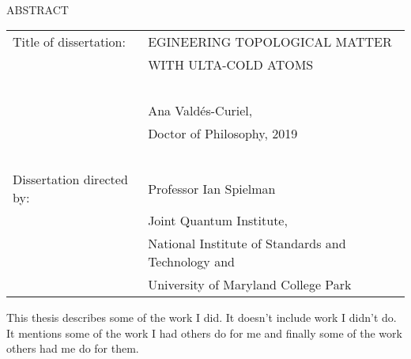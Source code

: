 
\hbox{\ }

\renewcommand{\baselinestretch}{1}
\small \normalsize

\begin{center}
\large{{ABSTRACT}} 

\vspace{3em} 

\end{center}
\hspace{-.15in}
\begin{tabular}{ll}
Title of dissertation:   
&				      {\large  EGINEERING TOPOLOGICAL MATTER} \\
&				      {\large  WITH ULTA-COLD ATOMS} \\
\ \\
&                     {\large  Ana Valdés-Curiel,} \\
&					  {\large  Doctor of Philosophy, 2019} \\
\ \\
Dissertation directed by: & {\large  Professor Ian Spielman} \\
&  							{\small	 Joint Quantum Institute,} \\
&  							{\small	 National Institute of Standards and Technology and} \\
&  							{\small	 University of Maryland College Park} \\
\end{tabular}

\vspace{3em}

\renewcommand{\baselinestretch}{2}
\large \normalsize

This thesis describes some of the work I did. It doesn't include work I didn't do. It mentions some of the work I had others do for me and finally some of the work others had me do for them.


